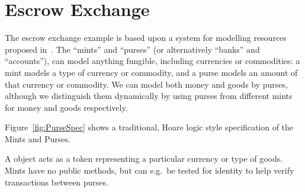 \section{Escrow Exchange }





The escrow exchange example is based upon a system   for modelling
resources proposed in~\cite{ELang}. The ``mints'' and ``purses'' (or
alternatively ``banks'' and ``accounts''),
can model anything fungible, including currencies
or commodities: a mint models a type of currency or commodity, and a
purse models an amount of that currency or commodity.
We can model
both money and goods by purses, although we distinguish them
dynamically by using purses from different mints for money and goods
respectively.


Figure~\ref{fig:PurseSpec} shows a traditional, Hoare logic style
specification of the %
 Mints and Purses. %
%
%
%
%


A  object acts as a token representing a particular
currency or type of goods. Mints have no public methods, but can e.g.\
be tested for identity to help verify transactions between purses.

